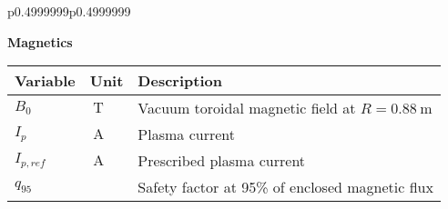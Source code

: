 \begin{table*}[h]
\begin{tabular}{p{}p{}}
{\begin{minipage}{0.4999999\textwidth}
\centering
\vspace{0.3em}\begin{center}\textbf{Magnetics}\end{center}\vspace{-1.2em}
\flushright
\begin{tabular}{p{}p{}p{}}
\toprule
Variable & Unit & Description \\
\midrule
$B_0$ & $\SI{}{\tesla}$ & Vacuum toroidal magnetic field at $R=\SI{0.88}{\meter}$ \\
$I_{p}$ & $\SI{}{\ampere}$ & Plasma current \\
$I_{p,\textit{ref}}$ & $\SI{}{\ampere}$ & Prescribed plasma current \\
$q_{95}$ & \hphantom{.} & Safety factor at 95\% of enclosed magnetic flux \\
\bottomrule
\end{tabular}


\end{minipage}}
\end{tabular}
\end{table*}
